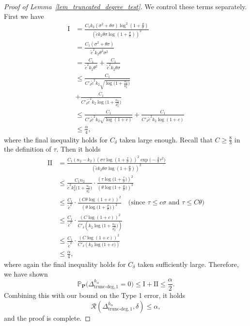 \documentclass{article}
\newcommand{\bbP}{\mathbb{P}}
\newcommand{\bP}{\mathbf{P}}
\newcommand{\cR}{\mathcal{R}}
\newcommand{\chisqlin}{\text{trunc-deg}}
\begin{document}
\begin{proof}[Proof of Lemma~\ref{lem_truncated_degree_test}]
We control these terms separately. First we have
\begin{align*}
    \text{I} &= \frac{C_1 k_2 (\sigma^2 + \theta \sigma) \log^2\left(1 + \frac{\theta}{\sigma}\right)}{\left(\tilde{c}k_2\theta \sigma \log\left(1 + \frac{\theta}{\sigma}\right)\right)^2} \\
    &= \frac{C_1(\sigma^2 + \theta \sigma)}{\tilde{c}^2k_2\theta^2 \sigma^2 } \\
    &= \frac{C_1}{\tilde{c}^2k_2\theta^2 }  + \frac{C_1}{\tilde{c}^2k_2\theta \sigma }\\
    &\leq \frac{C_1}{C'_\delta \tilde{c}^2 k_2\sqrt{\log\Big(1 + \frac{n_2}{k_2^2}\Big)}} \\
    &+ \frac{C_1}{C'_\delta \tilde{c}^2 k_2 \log\Big(1 + \frac{n_2}{k_2^2}\Big)}\\
    &\leq \frac{C_1}{C'_\delta \tilde{c}^2 k_2 \sqrt{\log(1 + c)}} + \frac{C_1}{C'_\delta \tilde{c}^2 k_2 \log(1 + c)} \\
    &\leq \frac{\alpha}{4},
\end{align*}
where the final inequality holds for $C_\delta$ taken large enough. Recall that $C \geq \frac{8}{3}$ in the definition of $\tau$. Then it holds
\begin{align*}
    \text{II} &= \frac{C_1 (n_2 - k_2)\left(\sigma \tau \log(1 + \frac{\tau}{\sigma})\right)^2\exp\big(-\frac38 \tau^2\big)}{\left(\tilde{c}k_2\theta \sigma \log\left(1 + \frac{\theta}{\sigma}\right)\right)^2} \\
    &\leq \frac{C_1n_2}{\tilde{c}^2k_2^2\Big(1 + \frac{n_2}{k_2^2}\Big)} \cdot \frac{\left(\tau \log\big(1 + \frac{\tau}{\sigma}\big)\right)^2}{\left(\theta \log\big(1 + \frac{\theta}{\sigma}\big)\right)^2} \\
    &\leq \frac{C_1}{\tilde{c}^2} \cdot \frac{\left(C\theta\log(1 + c)\right)^2}{\left(\theta \log\big(1 + \frac{\theta}{\sigma}\big)\right)^2} \quad \text{(since $\tau \leq c \sigma $ and $\tau \leq C \theta$)} \\
    &\leq \frac{C_1}{\tilde{c}^2} \cdot \frac{ \left(C\log(1 + c)\right)^2}{C'_\delta\left(k_2\log\Big(1 + \frac{n_2}{k_2^2}\Big)\right)} \\
    &\leq \frac{C_1}{\tilde{c}^2} \cdot \frac{ \left(C\log(1 + c)\right)^2}{C'_\delta\left(k_2\log\Big(1 + c\Big)\right)} \\
    &\leq \frac{\alpha}{4},
\end{align*}
where again the final inequality holds for $C_\delta$ taken sufficiently large. Therefore, we have shown
\[\bbP_{\bP}\big(\Delta^{h_\alpha}_{\chisqlin, 1} = 0\big) \leq \text{I} + \text{II} \leq \frac{\alpha}{2}.\]
Combining this with our bound on the Type 1 error, it holds
\[\cR(\Delta^{h_\alpha}_{\chisqlin, 1}, \delta) \leq \alpha,\]
and the proof is complete.
\end{proof}
\end{document}

